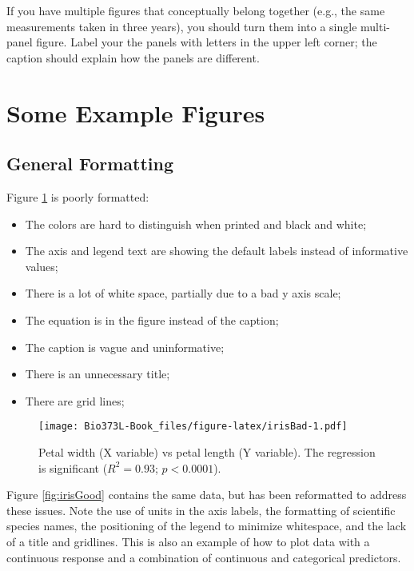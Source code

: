 \documentclass[]{book}
\providecommand{\tightlist}{%
  \setlength{\itemsep}{0pt}\setlength{\parskip}{0pt}}
\begin{document}
If you have multiple figures that conceptually belong together (e.g.,
the same measurements taken in three years), you should turn them into a
single multi-panel figure. Label your the panels with letters in the
upper left corner; the caption should explain how the panels are
different.

\section{Some Example Figures}\label{some-example-figures}

\subsection{General Formatting}\label{general-formatting}

Figure \ref{fig:irisBad} is poorly formatted:

\begin{itemize}
\tightlist
\item
  The colors are hard to distinguish when printed and black and white;
\item
  The axis and legend text are showing the default labels instead of
  informative values;
\item
  There is a lot of white space, partially due to a bad y axis scale;
\item
  The equation is in the figure instead of the caption;
\item
  The caption is vague and uninformative;
\item
  There is an unnecessary title;
\item
  There are grid lines;
\end{itemize}









\begin{figure}
\centering
\texttt{[image: Bio373L-Book\_files/figure-latex/irisBad-1.pdf]}
\caption{\label{fig:irisBad}Petal width (X variable) vs petal length (Y variable).
The regression is significant (\(R^2 = 0.93\); \(p<0.0001\)).}
\end{figure}

Figure \ref{fig:irisGood} contains the same data, but has been
reformatted to address these issues. Note the use of units in the axis
labels, the formatting of scientific species names, the positioning of
the legend to minimize whitespace, and the lack of a title and
gridlines. This is also an example of how to plot data with a continuous
response and a combination of continuous and categorical predictors.
\end{document}
